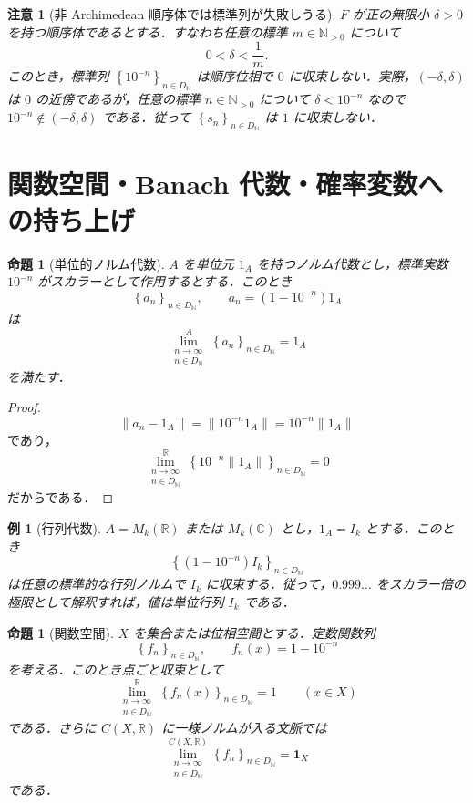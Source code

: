 \documentclass[a4paper,11pt]{ltjsarticle}
\theoremstyle{jpdef}
\newtheorem{warning}[definition]{注意}
\newtheorem{example}[definition]{例}
\theoremstyle{jpthm}
\newtheorem{proposition}[definition]{命題}
\newcommand{\N}{\mathbb{N}}
\newcommand{\R}{\mathbb{R}}
\newcommand{\C}{\mathbb{C}}
\newcommand{\Ns}{\N_{>0}}
\newcommand{\DN}{D_{\N}}
\newcommand{\seq}[2]{\left\{#1\right\}_{#2}}
\begin{document}
\begin{warning}[非 Archimedean 順序体では標準列が失敗しうる]
\(F\) が正の無限小 \(\delta>0\) を持つ順序体であるとする．すなわち任意の標準 \(m\in\Ns\) について
\[
  0<\delta<\frac1m.
\]
このとき，標準列 \(\seq{10^{-n}}{n\in\DN}\) は順序位相で \(0\) に収束しない．実際，\((-\delta,\delta)\) は \(0\) の近傍であるが，任意の標準 \(n\in\Ns\) について \(\delta<10^{-n}\) なので \(10^{-n}\notin(-\delta,
\delta)\) である．従って \(\seq{s_n}{n\in\DN}\) は \(1\) に収束しない．
\end{warning}


\section{関数空間・Banach 代数・確率変数への持ち上げ}

\begin{proposition}[単位的ノルム代数]
\(A\) を単位元 \(1_A\) を持つノルム代数とし，標準実数 \(10^{-n}\) がスカラーとして作用するとする．このとき
\[
  \seq{a_n}{n\in\DN},\qquad a_n=(1-10^{-n})1_A
\]
は
\[
  \lim_{\substack{n\to\infty\\ n\in\DN}}^{A}\seq{a_n}{n\in\DN}=1_A
\]
を満たす．
\end{proposition}

\begin{proof}
\[
  \|a_n-1_A\|=\|10^{-n}1_A\|=10^{-n}\|1_A\|
\]
であり，
\[
  \lim_{\substack{n\to\infty\\ n\in\DN}}^{\R}\seq{10^{-n}\|1_A\|}{n\in\DN}=0
\]
だからである．
\end{proof}

\begin{example}[行列代数]
\(A=M_k(\R)\) または \(M_k(\C)\) とし，\(1_A=I_k\) とする．このとき
\[
  \seq{(1-10^{-n})I_k}{n\in\DN}
\]
は任意の標準的な行列ノルムで \(I_k\) に収束する．従って，\(0.999\ldots\) をスカラー倍の極限として解釈すれば，値は単位行列 \(I_k\) である．
\end{example}

\begin{proposition}[関数空間]
\(X\) を集合または位相空間とする．定数関数列
\[
  \seq{f_n}{n\in\DN},
  \qquad
  f_n(x)=1-10^{-n}
\]
を考える．このとき点ごと収束として
\[
  \lim_{\substack{n\to\infty\\ n\in\DN}}^{\R}\seq{f_n(x)}{n\in\DN}=1
  \qquad(x\in X)
\]
である．さらに \(C(X,\R)\) に一様ノルムが入る文脈では
\[
  \lim_{\substack{n\to\infty\\ n\in\DN}}^{C(X,\R)}\seq{f_n}{n\in\DN}=\mathbf 1_X
\]
である．
\end{proposition}
\end{document}
